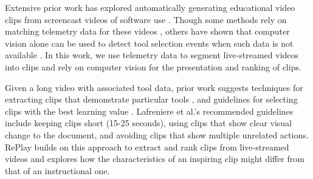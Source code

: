 Extensive prior work has explored automatically generating educational video clips from screencast videos of software use \cite{Pongnumkul2011, Chi2012, Banovic2012, Lafreniere2014, Nguyen2015}. Though some methods rely on matching telemetry data for these videos \cite{Grossman2010, Lafreniere2014, Chi2012}, others have shown that computer vision alone can be used to detect tool selection events when such data is not available \cite{Pongnumkul2011, Banovic2012}. In this work, we use telemetry data to segment live-streamed videos into clips and rely on computer vision for the presentation and ranking of clips. 

Given a long video with associated tool data, prior work suggests techniques for extracting clips that demonstrate particular tools \cite{Pongnumkul2011, Chi2012, Lafreniere2014}, and guidelines for selecting clips with the best learning value \cite{Lafreniere2014}. Lafreniere et al.'s recommended guidelines \cite{Lafreniere2014} include keeping clips short (15-25 seconds), using clips that show clear visual change to the document, and avoiding clips that show multiple unrelated actions. RePlay builds on this approach to extract and rank clips from live-streamed videos and explores how the characteristics of an inspiring clip might differ from that of an instructional one.
